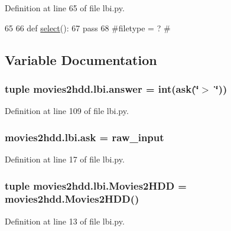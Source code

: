 Definition at line 65 of file lbi.\-py.


\begin{DoxyCode}
65 
66 \textcolor{keyword}{def }\hyperlink{namespacemovies2hdd_1_1lbi_a68a02cd4a9f9c827984c06b24947f42a}{select}():
67     \textcolor{keywordflow}{pass}
68     \textcolor{comment}{#filetype = ?}
\textcolor{comment}{#}
\end{DoxyCode}


\subsection{Variable Documentation}
\hypertarget{namespacemovies2hdd_1_1lbi_ab0bb9564b6047c61086071bdae2ba4ce}{
\subsubsection[{answer}]{\setlength{\rightskip}{0pt plus 5cm}tuple movies2hdd.\-lbi.\-answer = int({\bf ask}(\char`\"{}$>$ \char`\"{}))}}\label{namespacemovies2hdd_1_1lbi_ab0bb9564b6047c61086071bdae2ba4ce}


Definition at line 109 of file lbi.\-py.

\hypertarget{namespacemovies2hdd_1_1lbi_a4bc534737690c0a51a760418d39e3753}{
\subsubsection[{ask}]{\setlength{\rightskip}{0pt plus 5cm}movies2hdd.\-lbi.\-ask = raw\-\_\-input}}\label{namespacemovies2hdd_1_1lbi_a4bc534737690c0a51a760418d39e3753}


Definition at line 17 of file lbi.\-py.

\hypertarget{namespacemovies2hdd_1_1lbi_a0a37f11b0348a8fcc9af17541471fbd8}{
\subsubsection[{Movies2\-H\-D\-D}]{\setlength{\rightskip}{0pt plus 5cm}tuple movies2hdd.\-lbi.\-Movies2\-H\-D\-D = {\bf movies2hdd.\-Movies2\-H\-D\-D}()}}\label{namespacemovies2hdd_1_1lbi_a0a37f11b0348a8fcc9af17541471fbd8}


Definition at line 13 of file lbi.\-py.

